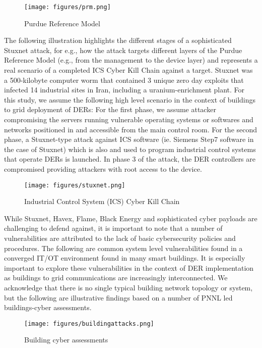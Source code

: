 \documentclass[conference]{IEEEtran}
\begin{document}
\begin{figure}[h!]
	\centering
	\texttt{[image: figures/prm.png]}
	\caption{Purdue Reference Model}
	\label{purdue}
\end{figure} 

The following illustration highlights the different stages of a sophisticated Stuxnet attack, for e.g., how the attack targets different layers of the Purdue Reference Model (e.g., from the management to the device layer) and represents a real scenario of a completed ICS Cyber Kill Chain against a target. Stuxnet was a 500-kilobyte computer worm that contained 3 unique zero day exploits that infected 14 industrial sites in Iran, including a uranium-enrichment plant. 
For this study, we assume the following high level scenario in the context of buildings to grid deployment of DERs: For the first phase, we assume attacker compromising the servers running vulnerable operating systems or softwares and networks positioned in and accessible from the main control room.  For the second phase, a Stuxnet-type attack against  ICS software (ie. Siemens Step7 software in the case of Stuxnet) which is also and used to program industrial control systems that operate DERs is launched. In phase 3 of the attack, the DER controllers are compromised providing attackers with root access to the device.  
\begin{figure}[h!]
	\centering
	\texttt{[image: figures/stuxnet.png]}
	\caption{Industrial Control System (ICS) Cyber Kill Chain}
	\label{ics}
\end{figure} 
While Stuxnet, Havex, Flame, Black Energy and sophisticated cyber payloads are challenging to defend against, it is important to note that a number of vulnerabilities are attributed to the lack of basic cybersecurity policies and procedures. The following are common system level vulnerabilities found in a converged IT/OT environment found in many smart buildings. It is especially important to explore these vulnerabilities in the context of DER implementation as buildings to grid communications are increasingly interconnected.  We acknowledge that there is no single typical building network topology or system, but the following are illustrative findings based on a number of PNNL led buildings-cyber assessments. 

\begin{figure}[h!]
	\centering
	\texttt{[image: figures/buildingattacks.png]}
	\caption{Building cyber assessments}
	\label{battacks}
\end{figure} 
\end{document}
